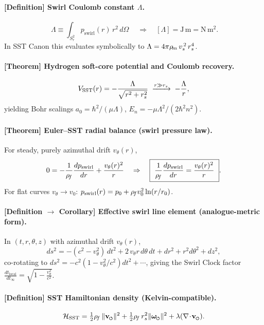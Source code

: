\documentclass[11pt]{article}
\begin{document}
    \paragraph{[Definition] Swirl Coulomb constant \(\Lambda\).}
    \[
        \boxed{\ \Lambda \equiv \int_{S_r^2} p_{\text{swirl}}(r)\, r^2\, d\Omega\ } \quad\Rightarrow\quad [\Lambda]=\mathrm{J\,m}=\mathrm{N\,m^2}.
    \]
    In SST Canon this evaluates symbolically to \( \Lambda=4\pi \rho_{\!m}\, v_s^{\,2}\, r_s^4\).

    \paragraph{[Theorem] Hydrogen soft-core potential and Coulomb recovery.}
    \[
        V_{\text{SST}}(r)=-\frac{\Lambda}{\sqrt{r^2+r_s^2}}
        \;\xrightarrow{r\gg r_s}\;
        -\frac{\Lambda}{r},
    \]
    yielding Bohr scalings
    \(a_0=\hbar^2/(\mu\Lambda)\), \(E_n=-\mu\Lambda^2/(2\hbar^2 n^2)\).

    \paragraph{[Theorem] Euler–SST radial balance (swirl pressure law).}
    For steady, purely azimuthal drift \(v_\theta(r)\),
    \[
        0=-\frac{1}{\rhof}\frac{dp_{\text{swirl}}}{dr}+\frac{v_\theta(r)^2}{r}
        \quad\Rightarrow\quad
        \boxed{\ \frac{1}{\rhof}\frac{dp_{\text{swirl}}}{dr}=\frac{v_\theta(r)^2}{r}\ }.
    \]
    For flat curves \(v_\theta\to v_0\): \(p_{\text{swirl}}(r)=p_0+\rho_{\!f} v_0^2 \ln(r/r_0)\).

    \paragraph{[Definition \(\to\) Corollary] Effective swirl line element (analogue-metric form).}
    In \((t,r,\theta,z)\) with azimuthal drift \(v_\theta(r)\),
    \[
        ds^2=-(c^2-v_\theta^2)\,dt^2+2\,v_\theta r\,d\theta\,dt+dr^2+r^2d\theta^2+dz^2,
    \]
    co-rotating to \(ds^2=-c^2(1-v_\theta^2/c^2)dt^2+\cdots\), giving the Swirl Clock factor
    \(\displaystyle \frac{dt_{\text{local}}}{dt_\infty}=\sqrt{1-\frac{v_\theta^2}{c^2}}\).

    \paragraph{[Definition] SST Hamiltonian density (Kelvin-compatible).}
    \[
        \mathcal{H}_{\text{SST}}=\tfrac12\rhof\,\|\vswirl\|^2+\tfrac12\rhof\,\rs^2\|\omegas\|^2+\lambda(\nabla\!\cdot\!\vswirl).
    \]
\end{document}
